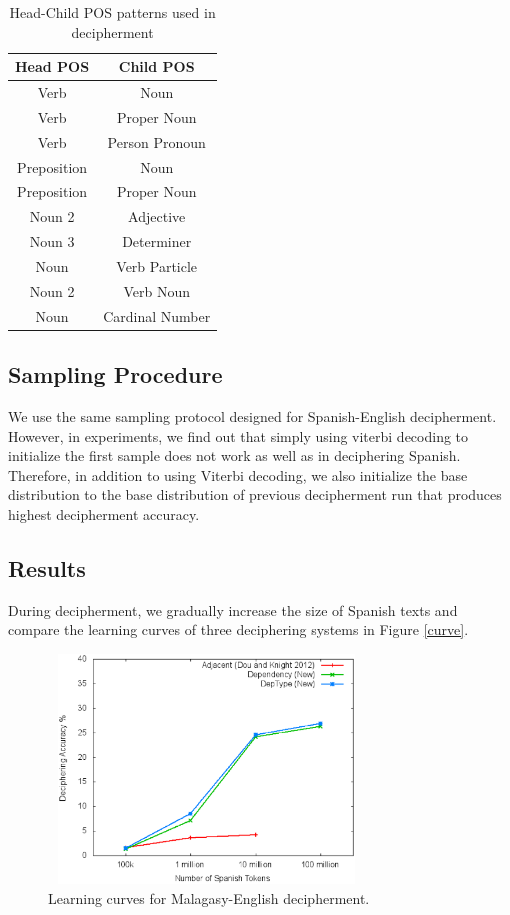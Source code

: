 %
 \begin{table}
 \begin{center}
 \begin{tabular}{ |c|c| } \hline
          Head POS & Child POS \\ \hline
Verb & Noun \\ \hline
Verb & Proper Noun \\ \hline
Verb & Person Pronoun \\ \hline
Preposition & Noun \\ \hline
Preposition & Proper Noun \\ \hline
Noun 2 & Adjective \\ \hline
Noun 3 & Determiner \\ \hline
Noun & Verb Particle \\ \hline
Noun 2 & Verb Noun \\ \hline
Noun & Cardinal Number \\ \hline
 \end{tabular}
 \caption{Head-Child POS patterns used in decipherment}
 \label{mlg-en-dep-type}
 \end{center}
 \end{table}
%

\subsection{Sampling Procedure}
We use the same sampling protocol designed for Spanish-English decipherment. However, in experiments, we find out that simply using viterbi decoding to initialize the first sample does not work as well as in deciphering Spanish. Therefore, in addition to using Viterbi decoding, we also initialize the base distribution to the base distribution of previous decipherment run that produces highest decipherment accuracy.

\subsection{Results}
During decipherment, we gradually increase the size of Spanish texts and compare the learning curves of three deciphering systems in Figure \ref{curve}.

 \begin{figure}[!ht]
  \centering
  \includegraphics[width=3.3in,height=2.4in]{curve}
  \caption{Learning curves for Malagasy-English decipherment.}
\label{mlg-en-curve}
\end{figure}

